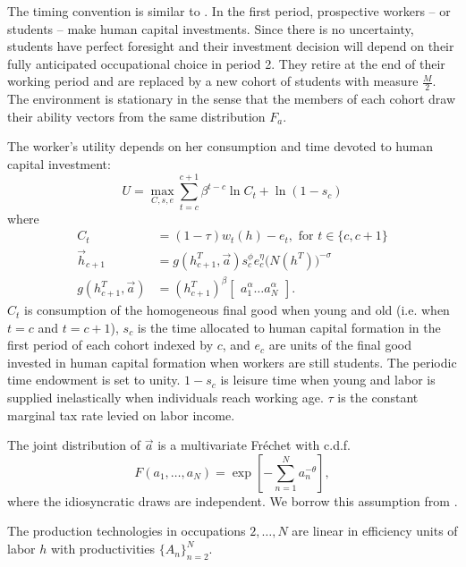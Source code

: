 \documentclass[onehalfspacing,11pt]{article}
\begin{document}
The timing convention is similar to \cite{Hsieh:2018}. In the first period, prospective workers -- or students -- make human capital investments. Since there is no uncertainty, students have perfect foresight and their investment decision will depend on their fully anticipated occupational choice in period 2. They retire at the end of their working period and are replaced by a new cohort of students with measure $\tfrac{M}{2}$. The environment is stationary in the sense that the members of each cohort draw their ability vectors from the same distribution $F_a$.

The worker's utility depends on her consumption and time devoted to human capital investment:
\begin{equation}
\label{ }
U = \max_{C,s,e}\sum_{t=c}^{c+1} \beta^{t-c} \ln C_t + \ln\left(1-s_c\right)
\end{equation}
where
\begin{align}
\label{}
C_t & =(1-\tau)w_t(h)-e_t, \textrm{ for } t \in \{c,c+1\}  \\
\vec{h}_{c+1} & =g(h_{c+1}^T,\vec{a})s_c^{\phi}e_c^{\eta}\big(N(h^T)\big)^{-\sigma} \label{eq:h}\\
g(h_{c+1}^T,\vec{a}) & =(h_{c+1}^T)^\beta \begin{bmatrix}a_1^\alpha \ldots a_N^\alpha \end{bmatrix}.
\end{align}
$C_t$ is consumption of the homogeneous final good when young and old (i.e. when $t=c$ and $t=c+1$), $s_c$ is the time allocated to human capital formation in the first period of each cohort indexed by $c$, and $e_c$ are units of the final good invested in human capital formation when workers are still students. The periodic time endowment is set to unity. $1-s_c$ is leisure time when young and labor is supplied inelastically when individuals reach working age. $\tau$ is the constant marginal tax rate levied on labor income.

The joint distribution of $\vec{a}$ is a multivariate Fr\'echet with c.d.f.
\begin{equation}
\label{ }
F(a_1,\ldots,a_N) = \exp \left[ -\sum_{n=1}^N a_n^{-\theta} \right],
\end{equation}
where the idiosyncratic draws are independent. We borrow this assumption from \cite{Eaton:2002}.

The production technologies in occupations $2,\ldots,N$ are linear in efficiency units of labor $h$ with productivities $\{A_n\}_{n=2}^N$.
\end{document}
